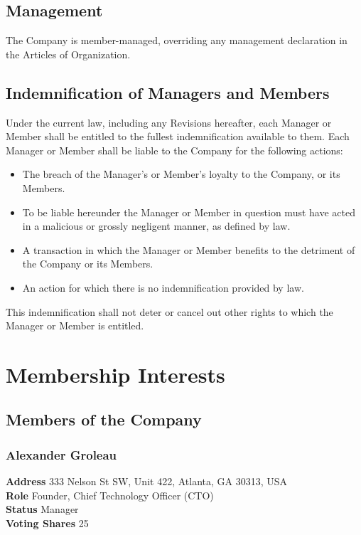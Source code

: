 \documentclass[11pt]{article}
\begin{document}
\subsection{Management}
The Company is member-managed, overriding any management declaration in the Articles of Organization.

\subsection{Indemnification of Managers and Members}
Under the current law, including any Revisions hereafter, each Manager or Member shall be entitled to the fullest indemnification available to them. Each Manager or Member shall be liable to the Company for the following actions:\\
\begin{itemize}
\item The breach of the Manager's or Member's loyalty to the Company, or its Members.
\item To be liable hereunder the Manager or Member in question must have acted in a malicious or grossly negligent manner, as defined by law.
\item A transaction in which the Manager or Member benefits to the detriment of the Company or its Members.
\item An action for which there is no indemnification provided by law.\\
\end{itemize}
This indemnification shall not deter or cancel out other rights to which the Manager or Member is entitled.

\section{Membership Interests}

\subsection{Members of the Company}

\subsubsection{Alexander Groleau}
\begin{minipage}{\textwidth}
\textbf{Address} 333 Nelson St SW, Unit 422, Atlanta, GA 30313, USA\\
\textbf{Role} Founder, Chief Technology Officer (CTO)\\
\textbf{Status} Manager \\
\textbf{Voting Shares} 25
\end{minipage}
\end{document}
